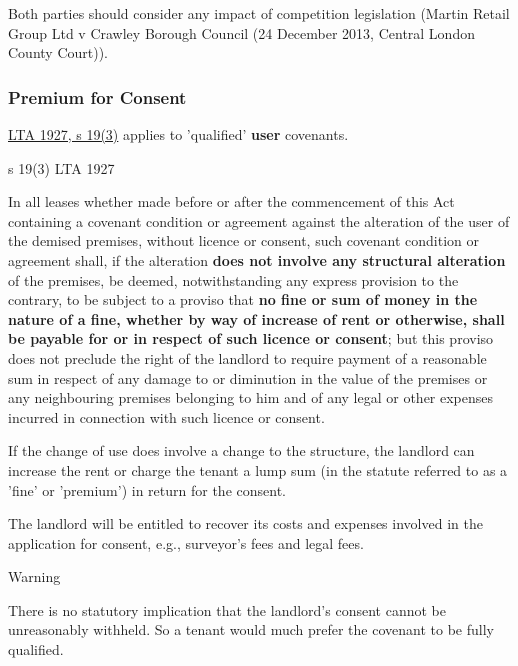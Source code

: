 \documentclass[
]{article}
\newenvironment{env-2aad614f-6fd6-4025-876c-fcdbeae766fb}
{
    \savenotes\tcolorbox[blanker,breakable,left=5pt,borderline west={2pt}{-4pt}{green}]
}
{
    \endtcolorbox\spewnotes
}
\newenvironment{env-1183acc6-7dc8-44d4-a985-6dec306e67fd}
{
    \savenotes\tcolorbox[blanker,breakable,left=5pt,borderline west={2pt}{-4pt}{orange}]
}
{
    \endtcolorbox\spewnotes
}
\begin{document}
Both parties should consider any impact of competition legislation
(Martin Retail Group Ltd v Crawley Borough Council (24 December 2013,
Central London County Court)).

\hypertarget{premium-for-consent}{%
\subsubsection{Premium for Consent}\label{premium-for-consent}}

\href{https://www.legislation.gov.uk/ukpga/Geo5/17-18/36/section/19}{LTA
1927, s 19(3)} applies to 'qualified' \textbf{user} covenants.

\begin{env-2aad614f-6fd6-4025-876c-fcdbeae766fb}

s 19(3) LTA 1927

In all leases whether made before or after the commencement of this Act
containing a covenant condition or agreement against the alteration of
the user of the demised premises, without licence or consent, such
covenant condition or agreement shall, if the alteration \textbf{does
not involve any structural alteration} of the premises, be deemed,
notwithstanding any express provision to the contrary, to be subject to
a proviso that \textbf{no fine or sum of money in the nature of a fine,
whether by way of increase of rent or otherwise, shall be payable for or
in respect of such licence or consent}; but this proviso does not
preclude the right of the landlord to require payment of a reasonable
sum in respect of any damage to or diminution in the value of the
premises or any neighbouring premises belonging to him and of any legal
or other expenses incurred in connection with such licence or consent.

\end{env-2aad614f-6fd6-4025-876c-fcdbeae766fb}

If the change of use does involve a change to the structure, the
landlord can increase the rent or charge the tenant a lump sum (in the
statute referred to as a 'fine' or 'premium') in return for the consent.

The landlord will be entitled to recover its costs and expenses involved
in the application for consent, e.g., surveyor's fees and legal fees.

\begin{env-1183acc6-7dc8-44d4-a985-6dec306e67fd}

Warning

There is no statutory implication that the landlord's consent cannot be
unreasonably withheld. So a tenant would much prefer the covenant to be
fully qualified.

\end{env-1183acc6-7dc8-44d4-a985-6dec306e67fd}
\end{document}
